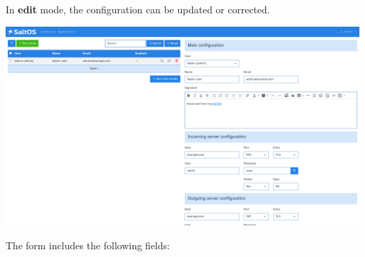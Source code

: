 \documentclass[a4paper]{article}
\begin{document}
In \textbf{edit} mode, the configuration can be updated or corrected.

\begin{center}\includegraphics[width=1\textwidth]{../ujest/snaps/test-screenshots-js-screenshots-emails-emails-accounts-edit-1-en-us-1-snap.png}\end{center}

The form includes the following fields:
\end{document}
